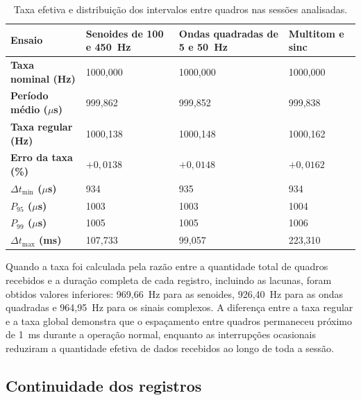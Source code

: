 \documentclass[a4paper,12pt]{fcte}
\begin{document}
\begin{table}[!htbp]
    \centering
    \caption{Taxa efetiva e distribuição dos intervalos entre quadros nas sessões analisadas.}
    \label{tab:taxa_efetiva_sessoes}
    \small
        \begin{tabularx}{\textwidth}{p{4.5cm} X X X}
            \hline
            \textbf{Ensaio} &
            \textbf{Senoides de 100 e 450~Hz} &
            \textbf{Ondas quadradas de 5 e 50~Hz} &
            \textbf{Multitom e sinc} \\
            \hline
            \textbf{Taxa nominal (Hz)}
            & 1000,000 & 1000,000 & 1000,000 \\

            \textbf{Período médio ($\mu$s)}
            & 999,862 & 999,852 & 999,838 \\

            \textbf{Taxa regular (Hz)}
            & 1000,138 & 1000,148 & 1000,162 \\

            \textbf{Erro da taxa (\%)}
            & $+0,0138$ & $+0,0148$ & $+0,0162$ \\

            \textbf{$\Delta t_{\min}$ ($\mu$s)}
            & 934 & 935 & 934 \\

            \textbf{$P_{95}$ ($\mu$s)}
            & 1003 & 1003 & 1004 \\

            \textbf{$P_{99}$ ($\mu$s)}
            & 1005 & 1005 & 1006 \\

            \textbf{$\Delta t_{\max}$ (ms)}
            & 107,733 & 99,057 & 223,310 \\
            \hline
        \end{tabularx}
\end{table}

Quando a taxa foi calculada pela razão entre a quantidade total de quadros recebidos e a duração completa de cada registro, incluindo as lacunas, foram obtidos valores inferiores: 969,66~Hz para as senoides, 926,40~Hz para as ondas quadradas e 964,95~Hz para os sinais complexos. A diferença entre a taxa regular e a taxa global demonstra que o espaçamento entre quadros permaneceu próximo de 1~ms durante a operação normal, enquanto as interrupções ocasionais reduziram a quantidade efetiva de dados recebidos ao longo de toda a sessão.

\subsection{Continuidade dos registros}
\label{subsec:continuidade_registros}
\end{document}
